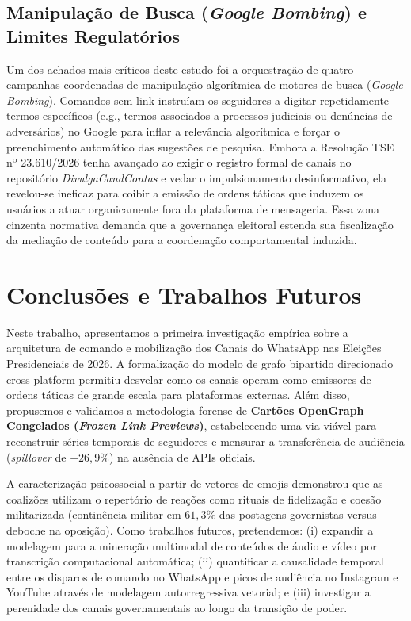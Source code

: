 \documentclass[12pt]{article}
\begin{document}
\subsection{Manipulação de Busca (\textit{Google Bombing}) e Limites Regulatórios}
Um dos achados mais críticos deste estudo foi a orquestração de quatro campanhas coordenadas de manipulação algorítmica de motores de busca (\textit{Google Bombing}). Comandos sem link instruíam os seguidores a digitar repetidamente termos específicos (e.g., termos associados a processos judiciais ou denúncias de adversários) no Google para inflar a relevância algorítmica e forçar o preenchimento automático das sugestões de pesquisa. Embora a Resolução TSE nº 23.610/2026 tenha avançado ao exigir o registro formal de canais no repositório \textit{DivulgaCandContas} e vedar o impulsionamento desinformativo, ela revelou-se ineficaz para coibir a emissão de ordens táticas que induzem os usuários a atuar organicamente fora da plataforma de mensageria. Essa zona cinzenta normativa demanda que a governança eleitoral estenda sua fiscalização da mediação de conteúdo para a coordenação comportamental induzida.

\section{Conclusões e Trabalhos Futuros}\label{sec:conclusoes}

Neste trabalho, apresentamos a primeira investigação empírica sobre a arquitetura de comando e mobilização dos Canais do WhatsApp nas Eleições Presidenciais de 2026. A formalização do modelo de grafo bipartido direcionado cross-platform permitiu desvelar como os canais operam como emissores de ordens táticas de grande escala para plataformas externas. Além disso, propusemos e validamos a metodologia forense de \textbf{Cartões OpenGraph Congelados (\textit{Frozen Link Previews})}, estabelecendo uma via viável para reconstruir séries temporais de seguidores e mensurar a transferência de audiência (\textit{spillover} de $+26,9\%$) na ausência de APIs oficiais.

A caracterização psicossocial a partir de vetores de emojis demonstrou que as coalizões utilizam o repertório de reações como rituais de fidelização e coesão militarizada (continência militar em $61,3\%$ das postagens governistas versus deboche na oposição). Como trabalhos futuros, pretendemos: (i) expandir a modelagem para a mineração multimodal de conteúdos de áudio e vídeo por transcrição computacional automática; (ii) quantificar a causalidade temporal entre os disparos de comando no WhatsApp e picos de audiência no Instagram e YouTube através de modelagem autorregressiva vetorial; e (iii) investigar a perenidade dos canais governamentais ao longo da transição de poder.
\end{document}
